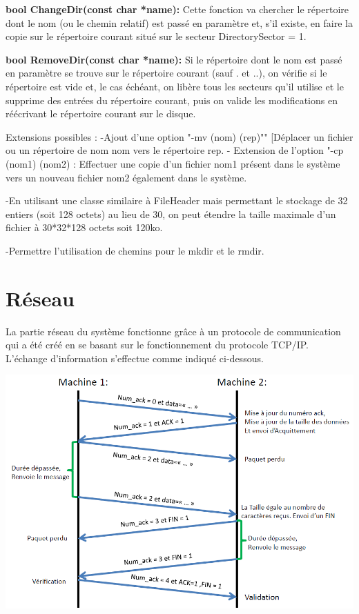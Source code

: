 \documentclass[12pt]{report}
\begin{document}
\textbf{bool ChangeDir(const char *name):} Cette fonction va chercher le répertoire dont le nom (ou le chemin relatif) est passé en paramètre et, s'il existe, en faire la copie sur le répertoire courant situé sur le secteur DirectorySector = 1.
\bigskip

\textbf{bool RemoveDir(const char *name):} Si le répertoire dont le nom est passé en paramètre se trouve sur le répertoire courant (sauf . et ..), on vérifie si le répertoire est vide et, le cas échéant, on libère tous les secteurs qu'il utilise et le supprime des entrées du répertoire courant, puis on valide les modifications en réécrivant le répertoire courant sur le disque.
\bigskip


Extensions possibles : 
-Ajout d'une option "-mv (nom) (rep)"" [Déplacer un fichier ou un répertoire de nom nom vers le répertoire rep.
- Extension de l'option "-cp (nom1) (nom2) : Effectuer une copie d'un fichier nom1 présent dans le système vers un nouveau fichier nom2 également dans le système.

-En utilisant une classe similaire à FileHeader mais permettant le stockage de 32 entiers (soit 128 octets) au lieu de 30, on peut étendre la taille maximale d'un fichier à 30*32*128 octets soit 120ko.

-Permettre l'utilisation de chemins pour le mkdir et le rmdir.



\section{Réseau}

La partie réseau du système fonctionne grâce à un protocole de communication qui a été créé en se basant sur le fonctionnement du protocole TCP/IP. L'échange d'information s'effectue comme indiqué ci-dessous.

\begin{center}
\includegraphics[scale=0.6]{protocoleReseau}
\end{center}
\end{document}

